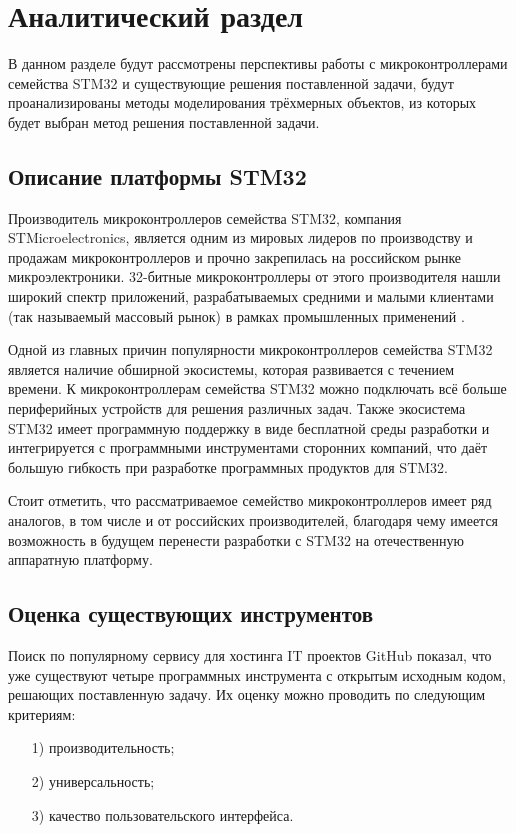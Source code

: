 \chapter{Аналитический раздел}
\label{cha:analysis}
%
%

В данном разделе будут рассмотрены перспективы работы с микроконтроллерами семейства STM32 и существующие решения поставленной задачи, 
будут проанализированы методы моделирования трёхмерных объектов, из которых будет выбран метод решения поставленной задачи.

\section{Описание платформы STM32}

Производитель микроконтроллеров семейства STM32, компания STMicroelectronics, является одним из мировых лидеров по производству и продажам микроконтроллеров и прочно закрепилась на российском рынке микроэлектроники. 32-битные микроконтроллеры от этого производителя нашли широкий спектр приложений, разрабатываемых средними и малыми клиентами (так называемый массовый рынок) в рамках промышленных применений \cite{STMicroelectronics_description}.

Одной из главных причин популярности микроконтроллеров семейства STM32 является наличие обширной экосистемы, которая развивается с течением времени. К микроконтроллерам семейства STM32 можно подключать всё больше периферийных устройств для решения различных задач. Также экосистема STM32 имеет программную поддержку в виде бесплатной среды разработки и интегрируется с программными инструментами сторонних компаний, что даёт большую гибкость при разработке программных продуктов для STM32.

Стоит отметить, что рассматриваемое семейство микроконтроллеров имеет ряд аналогов, в том числе и от российских производителей, благодаря чему имеется возможность в будущем перенести разработки с STM32 на отечественную аппаратную платформу.

\section{Оценка существующих инструментов}

Поиск по популярному сервису для хостинга IT проектов GitHub \cite{git0} показал, что уже существуют четыре программных инструмента с открытым исходным кодом, решающих поставленную задачу. Их оценку можно проводить по следующим критериям:
\begin{enumerate}
	\item[1)] производительность;
	\item[2)] универсальность;
	\item[3)] качество пользовательского интерфейса.
\end{enumerate}


